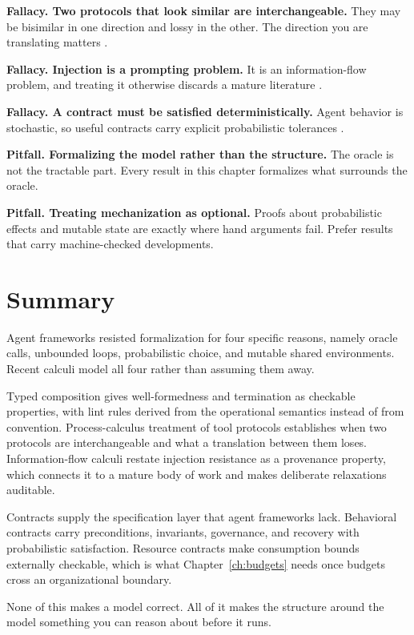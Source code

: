 \textbf{Fallacy. Two protocols that look similar are interchangeable.} They may
be bisimilar in one direction and lossy in the other. The direction you are
translating matters \cite{toolcalculus2026}.

\textbf{Fallacy. Injection is a prompting problem.} It is an information-flow
problem, and treating it otherwise discards a mature literature
\cite{llmbda2026}.

\textbf{Fallacy. A contract must be satisfied deterministically.} Agent behavior
is stochastic, so useful contracts carry explicit probabilistic tolerances
\cite{agentcontracts2026}.

\textbf{Pitfall. Formalizing the model rather than the structure.} The oracle is
not the tractable part. Every result in this chapter formalizes what surrounds
the oracle.

\textbf{Pitfall. Treating mechanization as optional.} Proofs about probabilistic
effects and mutable state are exactly where hand arguments fail. Prefer results
that carry machine-checked developments.

\section{Summary}

Agent frameworks resisted formalization for four specific reasons, namely oracle
calls, unbounded loops, probabilistic choice, and mutable shared environments.
Recent calculi model all four rather than assuming them away.

Typed composition gives well-formedness and termination as checkable properties,
with lint rules derived from the operational semantics instead of from
convention. Process-calculus treatment of tool protocols establishes when two
protocols are interchangeable and what a translation between them loses.
Information-flow calculi restate injection resistance as a provenance property,
which connects it to a mature body of work and makes deliberate relaxations
auditable.

Contracts supply the specification layer that agent frameworks lack. Behavioral
contracts carry preconditions, invariants, governance, and recovery with
probabilistic satisfaction. Resource contracts make consumption bounds
externally checkable, which is what Chapter~\ref{ch:budgets} needs once budgets
cross an organizational boundary.

None of this makes a model correct. All of it makes the structure around the
model something you can reason about before it runs.

